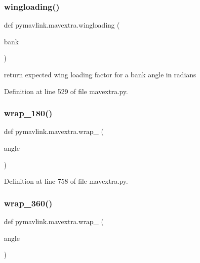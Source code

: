 \subsubsection{\texorpdfstring{wingloading()}{wingloading()}}
{\footnotesize\ttfamily def pymavlink.\+mavextra.\+wingloading (\begin{DoxyParamCaption}\item[{}]{bank }\end{DoxyParamCaption})}

\begin{DoxyVerb}return expected wing loading factor for a bank angle in radians\end{DoxyVerb}
 

Definition at line 529 of file mavextra.\+py.

\mbox{\label{namespacepymavlink_1_1mavextra_a85414a40febdc276343f85e8ee63d3b4}} 
\subsubsection{\texorpdfstring{wrap\_180()}{wrap\_180()}}
{\footnotesize\ttfamily def pymavlink.\+mavextra.\+wrap\+\_ (\begin{DoxyParamCaption}\item[{}]{angle }\end{DoxyParamCaption})}



Definition at line 758 of file mavextra.\+py.

\mbox{\label{namespacepymavlink_1_1mavextra_ace15c40f51a7caffd4a6364bb0afea52}} 
\subsubsection{\texorpdfstring{wrap\_360()}{wrap\_360()}}
{\footnotesize\ttfamily def pymavlink.\+mavextra.\+wrap\+\_ (\begin{DoxyParamCaption}\item[{}]{angle }\end{DoxyParamCaption})}



